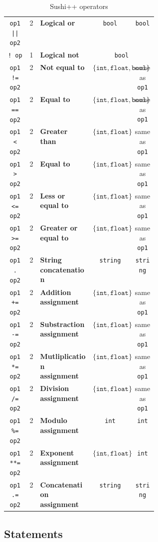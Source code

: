 \documentclass[a4paper,11pt]{article}
\begin{document}
\begin{table}
\begin{tabular}{|c|c|p{0.35\linewidth}|cc|}
	\texttt{op1 || op2} & 2 & \textbf{Logical or} & \texttt{bool} & \texttt{bool} \\
	\texttt{! op} & 1 & \textbf{Logical not} & \multicolumn{2}{c|}{\texttt{bool}}\\
	\texttt{op1 != op2} & 2 & \textbf{Not equal to} & $\{\texttt{int}, \texttt{float}, \texttt{bool}\}$ & same as \texttt{op1}\\
	\texttt{op1 == op2} & 2 & \textbf{Equal to} & $\{\texttt{int}, \texttt{float}, \texttt{bool}\}$ & same as \texttt{op1}\\
	\texttt{op1 < op2} & 2 & \textbf{Greater than} & $\{\texttt{int}, \texttt{float}\}$ & same as \texttt{op1}\\
	\texttt{op1 > op2} & 2 & \textbf{Equal to} & $\{\texttt{int}, \texttt{float}\}$ & same as \texttt{op1}\\
	\texttt{op1 <= op2} & 2 & \textbf{Less or equal to} & $\{\texttt{int}, \texttt{float}\}$ & same as \texttt{op1}\\
	\texttt{op1 >= op2} & 2 & \textbf{Greater or equal to} & $\{\texttt{int}, \texttt{float}\}$ & same as \texttt{op1}\\
	\texttt{op1 . op2} & 2 & \textbf{String concatenation} & \texttt{string} & \texttt{string} \\
	\texttt{op1 += op2} & 2 & \textbf{Addition assignment}  & $\{\texttt{int}, \texttt{float}\}$ & same as \texttt{op1}\\
	\texttt{op1 -= op2} & 2 & \textbf{Substraction assignment} & $\{\texttt{int}, \texttt{float}\}$ & same as \texttt{op1}\\
	\texttt{op1 *= op2} & 2 & \textbf{Mutliplication assignment} & $\{\texttt{int}, \texttt{float}\}$ & same as \texttt{op1}\\
	\texttt{op1 /= op2} & 2 & \textbf{Division assignment}  & $\{\texttt{int}, \texttt{float}\}$ & same as \texttt{op1}\\
	\texttt{op1 \%= op2} & 2 & \textbf{Modulo assignment} & \texttt{int} & \texttt{int} \\
	\texttt{op1 **= op2} & 2 & \textbf{Exponent assignment} & $\{\texttt{int}, \texttt{float}\}$ & \texttt{int} \\
	\texttt{op1 .= op2} & 2 & \textbf{Concatenation assignment} & \texttt{string} & \texttt{string} \\
	\hline
	\end{tabular}
	\caption{Sushi++ operators}
	\label{tab:operators}
\end{table}
\subsection{Statements}
\end{document}
